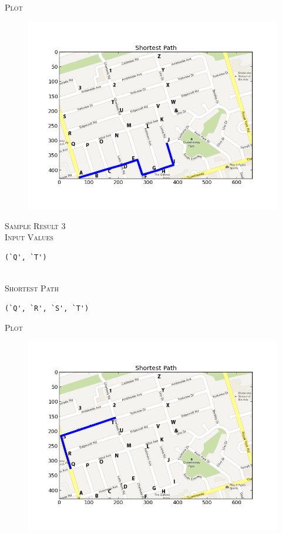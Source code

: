 \documentclass[pdftex,12pt,a4paper]{article}
\newcommand{\nspace}{\\[0.25cm]}
\begin{document}
\textsc{Plot} \hfill \nspace

\begin{figure}[h!]
  \centering
	\includegraphics[scale=0.60]{img/dijkstra_test_2.png}
\end{figure}



\textsc{\large Sample Result 3} \hfill \nspace

\textsc{Input Values} \hfill \nspace

\begin{verbatim}
(`Q', `T')
\end{verbatim}

\hfill \nspace
\textsc{Shortest Path} \hfill \nspace

\begin{verbatim}
(`Q', `R', `S', `T')
\end{verbatim}

\newpage
\textsc{Plot}

\begin{figure}[h!]
  \centering
	\includegraphics[scale=0.60]{img/dijkstra_test_3.png}
\end{figure}
\end{document}
